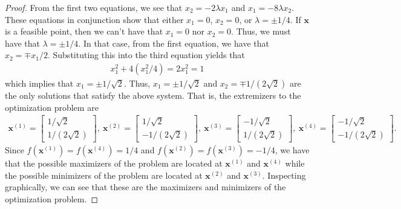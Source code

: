\documentclass[12pt]{article}
\theoremstyle{definition}
\newcommand{\vc}[1]{\boldsymbol{#1}}
\begin{document}
\begin{proof}
  From the first two equations, we see that $x_2 = -2\lambda x_1$ and $x_1 = -8\lambda x_2$.
  These equations in conjunction show that either $x_1 = 0$, $x_2 = 0$, or $\lambda = \pm 1/4$. If $\vc{x}$ is a feasible point, then
  we can't have that $x_1 = 0$ nor $x_2=0$. Thus, we must have that $\lambda=\pm 1/4$. In that case, from the first equation,
  we have that $x_2 = \mp x_1/2$. Substituting this into the third equation yields that
  \begin{align*}
    x_1^2 + 4 (x_1^2/4) = 2x_1^2 = 1
  \end{align*}
  which implies that $x_1 = \pm 1 / \sqrt{2}$. Thus, $x_1 = \pm 1 /\sqrt{2}$ and $x_2 = \mp 1 / (2\sqrt{2})$ are the only solutions that satisfy the above system.
  That is, the extremizers to the optimization problem are
  \begin{align*}
    \vc{x}^{(1)} = \begin{bmatrix}1 / \sqrt{2} \\ 1 / (2\sqrt{2})\end{bmatrix},\
    \vc{x}^{(2)} = \begin{bmatrix}1 / \sqrt{2} \\ -1 / (2\sqrt{2})\end{bmatrix},\
    \vc{x}^{(3)} = \begin{bmatrix}-1 / \sqrt{2} \\ 1 / (2\sqrt{2})\end{bmatrix},\
    \vc{x}^{(4)} = \begin{bmatrix}-1 / \sqrt{2} \\ -1 / (2\sqrt{2})\end{bmatrix}.
  \end{align*}
  Since $f(\vc{x}^{(1)}) = f(\vc{x}^{(4)}) = 1/4$ and $f(\vc{x}^{(2)}) = f(\vc{x}^{(3)}) = -1/4$, we have that the possible
  maximizers of the problem are located at $\vc{x}^{(1)}$ and $\vc{x}^{(4)}$ while the
  possible minimizers of the problem are located at $\vc{x}^{(2)}$ and $\vc{x}^{(3)}$.
  Inspecting graphically, we can see that these are the maximizers and minimizers of the
  optimization problem.
\end{proof}
\newpage
\end{document}
